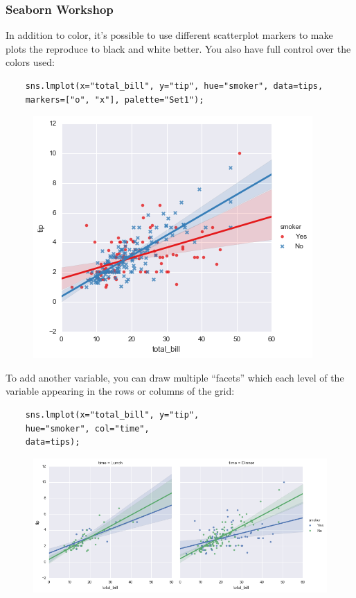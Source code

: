 \documentclass{beamer}
\begin{document}
\begin{frame}[fragile]
	\frametitle{Seaborn Workshop}
	\large
	
	In addition to color, it’s possible to use different scatterplot markers to make plots the reproduce to black and white better. You also have full control over the colors used:
	\begin{verbatim}
	sns.lmplot(x="total_bill", y="tip", hue="smoker", data=tips,
	markers=["o", "x"], palette="Set1");
	\end{verbatim}
	\begin{figure}
		\centering
		\includegraphics[width=0.7\linewidth]{images/regression_41_0}
	\end{figure}
\end{frame}
\begin{frame}[fragile]
	\large
	To add another variable, you can draw multiple “facets” which each level of the variable appearing in the rows or columns of the grid:
	\begin{verbatim}
	sns.lmplot(x="total_bill", y="tip", 
	hue="smoker", col="time", 
	data=tips);
	\end{verbatim}
	
	\begin{figure}
		\centering
		\includegraphics[width=0.55\linewidth]{images/regression_43_0}
	\end{figure}
	
\end{frame}
\end{document}
